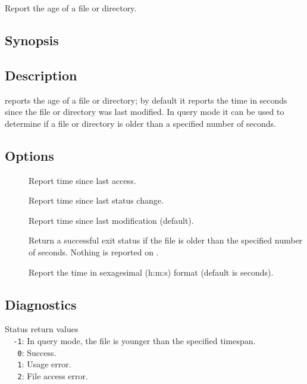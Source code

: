 Report the age of a file or directory.

\subsection*{Synopsis}

\begin{synopsis}
\end{synopsis}

\subsection*{Description}

 reports the age of a file or directory; by default it reports the
time in seconds since the file or directory was last modified.  In query mode
it can be used to determine if a file or directory is older than a specified
number of seconds.

\subsection*{Options}

\begin{description}
\item[]
   Report time since last access.

\item[]
   Report time since last status change.

\item[]
   Report time since last modification (default).

\item[]
   Return a successful exit status if the file is older than the specified
   number of seconds.  Nothing is reported on .

\item[]
   Report the time in sexagesimal (h:m:s) format (default is seconds).
\end{description}

\subsection*{Diagnostics}

Status return values
\\ \verb+  -1+:  In query mode, the file is younger than the specified timespan.
\\ \verb+   0+:  Success.
\\ \verb+   1+:  Usage error.
\\ \verb+   2+:  File access error.

